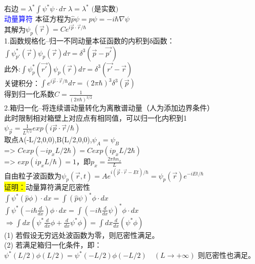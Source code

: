 \documentclass[a4paper,8pt]{extarticle} %
\newcommand{\bluetext}[1]{\textcolor{blue}{#1}}
\newcommand{\yellowback}[1]{\colorbox{yellow}{#1}}
\begin{document}
\begin{multicols}{3}
$\text{右边} = \lambda^*\int \psi^*\psi\cdot d\tau$
$\lambda = \lambda^* \text{ (是实数)}$\\
\bluetext{动量算符}
本征方程为$\hat{p}\psi = p\psi=-i\hbar\nabla\psi$\\
其解为$\psi_p(\vec{r}) = Ce^{i\vec{p}\cdot\vec{r}/\hbar}$\\
1.函数规格化--归一不同动量本征函数的内积到δ函数：\\
$\int\psi^*_{p'}(\vec{r})\psi_{p}(\vec{r})d\tau = \delta^3(\vec{p}-\vec{p'})$\\
此外:$\int\psi^*_{p}(\vec{r'})\psi_{p}(\vec{r})d\tau = \delta^3(\vec{r'}-\vec{r})$\\
关键积分：$\int e^{i\vec{p}\cdot\vec{r}/\hbar}d\tau = (2\pi\hbar)^3\delta^3(\vec{p})$\\
得到归一化系数$C = \frac{1}{(2\pi\hbar)^{3/2}}$\\
2.箱归一化--将连续谱动量转化为离散谱动量（人为添加边界条件）\\
此时限制相对箱壁上对应点有相同值，可以归一化内积到1\\
$\psi_{\vec{p}}=\frac{1}{L^{3/2}}exp(i\vec{p}\cdot\vec{r}/\hbar)$\\
取点A(-L/2,0,0),B(L/2,0,0),$\psi_A=\psi_B$\\
=> $Cexp(-ip_xL/2\hbar)=Cexp(ip_xL/2\hbar)$\\
=> $exp(ip_xL/\hbar)=1$，即$p_x=\frac{2\pi\hbar n_x}{L}$\\
自由粒子波函数为$\psi_p(\vec{r},t)=Ae^{i(\vec{p}\cdot\vec{r}-Et)/\hbar}=\psi_p(\vec{r})e^{-iEt/\hbar}$\\
\yellowback{证明：}动量算符满足厄密性\\
$\int \psi^*(\hat{p}\phi)\cdot dx = \int(\hat{p}\psi)^*\phi\cdot dx$\\
$\int \psi^*(-i\hbar\frac{d}{dx})\phi\cdot dx = \int(-i\hbar\frac{d}{dx}\psi)^*\phi\cdot dx$\\
$\Rightarrow \int dx(\psi^*\frac{d}{dx}\phi + \frac{d}{dx}\psi^*\phi) = \int dx\frac{d}{dx}(\psi^*\phi)$\\
(1) 若假设无穷远处波函数为零，则厄密性满足。\\
(2) 若满足箱归一化条件，即：\\
$\psi^*(L/2)\phi(L/2) = \psi^*(-L/2)\phi(-L/2) \quad (L \rightarrow +\infty)$
则厄密性也满足。


\end{multicols}
\end{document}
